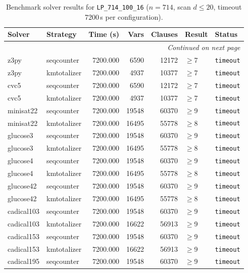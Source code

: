 \begin{longtable}{llrrrl p{}}
\caption{Benchmark solver results for \texttt{LP\_714\_100\_16} ($n=714$, scan $d \leq 20$, timeout 7200\,s per configuration).} \label{tab:bench-LP_714_100_16} \\
\toprule
Solver & Strategy & Time (s) & Vars & Clauses & Result & Status \\
\midrule
\endhead
\midrule
\multicolumn{7}{r}{\textit{Continued on next page}} \\
\midrule
\endfoot
\bottomrule
\endlastfoot
z3py & seqcounter & 7200.000 & 6590 & 12172 & $\geq$7 & \texttt{timeout} \\
z3py & kmtotalizer & 7200.000 & 4937 & 10377 & $\geq$7 & \texttt{timeout} \\
cvc5 & seqcounter & 7200.000 & 6590 & 12172 & $\geq$7 & \texttt{timeout} \\
cvc5 & kmtotalizer & 7200.000 & 4937 & 10377 & $\geq$7 & \texttt{timeout} \\
minisat22 & seqcounter & 7200.000 & 19548 & 60370 & $\geq$9 & \texttt{timeout} \\
minisat22 & kmtotalizer & 7200.000 & 16495 & 55778 & $\geq$8 & \texttt{timeout} \\
glucose3 & seqcounter & 7200.000 & 19548 & 60370 & $\geq$9 & \texttt{timeout} \\
glucose3 & kmtotalizer & 7200.000 & 16495 & 55778 & $\geq$8 & \texttt{timeout} \\
glucose4 & seqcounter & 7200.000 & 19548 & 60370 & $\geq$9 & \texttt{timeout} \\
glucose4 & kmtotalizer & 7200.000 & 16495 & 55778 & $\geq$8 & \texttt{timeout} \\
glucose42 & seqcounter & 7200.000 & 19548 & 60370 & $\geq$9 & \texttt{timeout} \\
glucose42 & kmtotalizer & 7200.000 & 16495 & 55778 & $\geq$8 & \texttt{timeout} \\
cadical103 & seqcounter & 7200.000 & 19548 & 60370 & $\geq$9 & \texttt{timeout} \\
cadical103 & kmtotalizer & 7200.000 & 16622 & 56913 & $\geq$9 & \texttt{timeout} \\
cadical153 & seqcounter & 7200.000 & 19548 & 60370 & $\geq$9 & \texttt{timeout} \\
cadical153 & kmtotalizer & 7200.000 & 16622 & 56913 & $\geq$9 & \texttt{timeout} \\
cadical195 & seqcounter & 7200.000 & 19548 & 60370 & $\geq$9 & \texttt{timeout} \\

\end{longtable}
